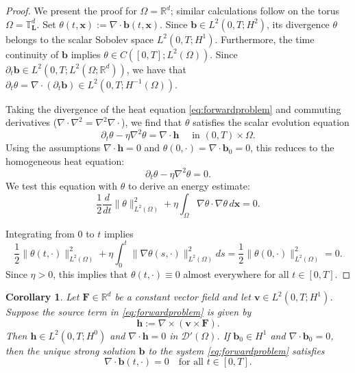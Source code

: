 \documentclass[12pt]{article}
\newtheorem{corollary}{Corollary}
\begin{document}
\begin{proof} We present the proof for $\Omega = \mathbb{R}^d$;   similar calculations follow on the torus $\Omega = \mathbb{T}_{\boldsymbol{L}}^d$. Set $\theta(t,\boldsymbol{x}) := \nabla\cdot \boldsymbol{b}(t, \boldsymbol{x})$. Since $\boldsymbol{b} \in L^2(0,T; H^2)$, its divergence $\theta$ belongs to the scalar Sobolev space $L^2(0,T; H^1)$. Furthermore, the time continuity of $\boldsymbol{b}$ implies $\theta \in C([0,T]; L^2(\Omega))$. Since $\partial_t \boldsymbol{b} \in L^2(0,T; L^2(\Omega; \mathbb{R}^d))$, we have that $\partial_t \theta = \nabla \cdot (\partial_t \boldsymbol{b}) \in L^2(0,T; H^{-1}(\Omega))$.


  Taking the divergence of the heat equation \eqref{eq:forwardproblem} and commuting derivatives ($\nabla \cdot \nabla^2 = \nabla^2 \nabla \cdot$), we find that $\theta$ satisfies the scalar evolution equation
  \[\partial_t \theta - \eta \nabla^2 \theta = \nabla \cdot \boldsymbol{h} \quad \text{ in }  (0,T)\times\Omega.\]
  Using the assumptions $\nabla \cdot \boldsymbol{h} = 0$ and $\theta(0,\cdot) = \nabla \cdot \boldsymbol{b}_0 = 0$, this reduces to the homogeneous heat equation:
  \[
    \partial_t \theta - \eta \nabla^2 \theta = 0.
  \]
  We test this equation with $\theta$ to derive an energy estimate:
  \[
    \frac{1}{2} \frac{d}{dt} \|\theta\|_{L^2(\Omega)}^2 + \eta \int_\Omega \nabla \theta \cdot \nabla \theta \, d\boldsymbol{x}=0.
  \]

  Integrating from $0$ to $t$ implies \[\frac{1}{2}\|\theta(t,\cdot)\|_{L^2(\Omega)}^2+\eta\int_0^t\|\nabla \theta(s,\cdot)\|^2_{L^2(\Omega)} ds  = \frac{1}{2}\|\theta(0,\cdot)\|_{L^2(\Omega)}^2 = 0.\] Since $\eta>0$, this implies that $\theta(t,\cdot) \equiv 0$ almost everywhere for all $t \in [0,T]$.


\end{proof}



\begin{corollary}\label{eq:vimpliesh_reg}
Let $\mathbf{F} \in \mathbb{R}^d$ be a constant vector field and let $\boldsymbol{v} \in L^2(0,T; H^1)$. Suppose the source term in \eqref{eq:forwardproblem} is given by 
  \[
    {{} \boldsymbol{h} := \nabla \times (\boldsymbol{v}\times \mathbf{F} ).}
  \]
  Then $\boldsymbol{h} \in L^2(0,T;H^0)$ and $\nabla \cdot \boldsymbol{h} = 0$ in $\mathcal{D}'(\Omega)$.  If $\boldsymbol{b}_0 \in H^1$ and $\nabla \cdot \boldsymbol{b}_0 = 0$, then the unique strong solution $\boldsymbol{b}$ to the system \eqref{eq:forwardproblem} satisfies 
      \[
        \nabla \cdot \boldsymbol{b}(t, \cdot) = 0  \quad \textrm{for all } t \in [0,T].
      \]
          
 
\end{corollary}
\end{document}
